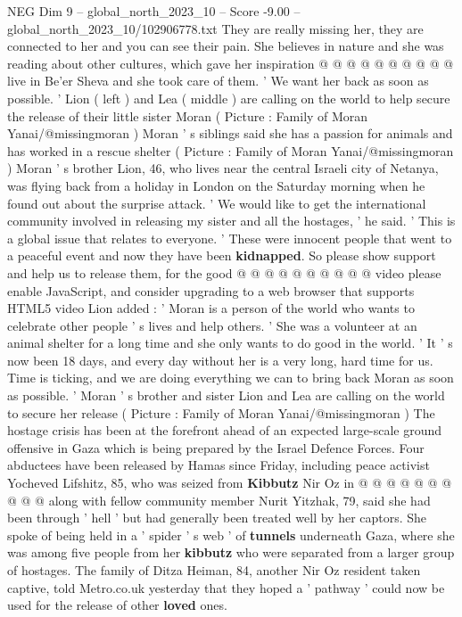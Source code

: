 \begin{textsample}{NEG Dim 9 – global\_north\_2023\_10 – Score -9.00 – global\_north\_2023\_10/102906778.txt}
They are really missing her, they are connected to her and you can see their pain.
She believes in nature and she was reading about other cultures, which gave her inspiration @ @ @ @ @ @ @ @ @ @ live in Be'er Sheva and she took care of them. ' We want her back as soon as possible. ' Lion ( left ) and Lea ( middle ) are calling on the world to help secure the release of their little sister Moran ( Picture : Family of Moran Yanai/@missingmoran ) Moran ' s siblings said she has a passion for animals and has worked in a rescue shelter ( Picture : Family of Moran Yanai/@missingmoran ) Moran ' s brother Lion, 46, who lives near the central Israeli city of Netanya, was flying back from a holiday in London on the Saturday morning when he found out about the surprise attack. ' We would like to get the international community involved in releasing my sister and all the hostages, ' he said. ' This is a global issue that relates to everyone. ' These were innocent people that went to a peaceful event and now they have been \textbf{kidnapped}.
So please show support and help us to release them, for the good @ @ @ @ @ @ @ @ @ @ video please enable JavaScript, and consider upgrading to a web browser that supports HTML5 video Lion added : ' Moran is a person of the world who wants to celebrate other people ' s lives and help others. ' She was a volunteer at an animal shelter for a long time and she only wants to do good in the world. ' It ' s now been 18 days, and every day without her is a very long, hard time for us.
Time is ticking, and we are doing everything we can to bring back Moran as soon as possible. ' Moran ' s brother and sister Lion and Lea are calling on the world to secure her release ( Picture : Family of Moran Yanai/@missingmoran ) The hostage crisis has been at the forefront ahead of an expected large-scale ground offensive in Gaza which is being prepared by the Israel Defence Forces.
Four abductees have been released by Hamas since Friday, including peace activist Yocheved Lifshitz, 85, who was seized from \textbf{Kibbutz} Nir Oz in @ @ @ @ @ @ @ @ @ @ along with fellow community member Nurit Yitzhak, 79, said she had been through ' hell ' but had generally been treated well by her captors.
She spoke of being held in a ' spider ' s web ' of \textbf{tunnels} underneath Gaza, where she was among five people from her \textbf{kibbutz} who were separated from a larger group of hostages.
The family of Ditza Heiman, 84, another Nir Oz resident taken captive, told Metro.co.uk yesterday that they hoped a ' pathway ' could now be used for the release of other \textbf{loved} ones.

\end{textsample}

